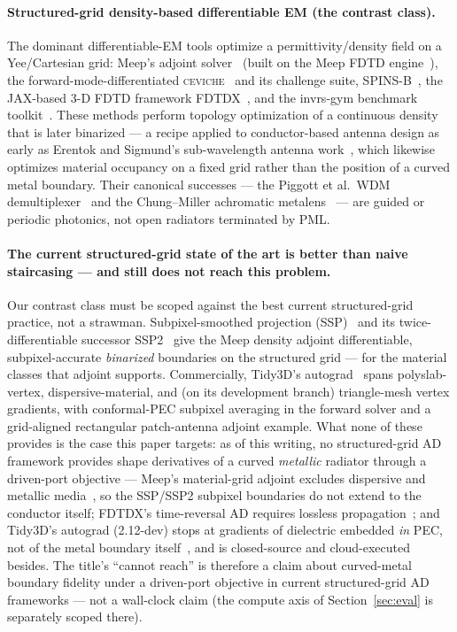 \documentclass{anvil-paper}
\begin{document}
\paragraph{Structured-grid density-based differentiable EM (the contrast class).}
The dominant differentiable-EM tools optimize a permittivity/density field on a
Yee/Cartesian grid: Meep's adjoint solver~\cite{hammond2022meepadjoint} (built
on the Meep FDTD engine~\cite{oskooi2010meep}), the forward-mode-differentiated
\textsc{ceviche}~\cite{hughes2019forward} and its challenge suite,
SPINS-B~\cite{su_spinsb}, the JAX-based 3-D FDTD framework
FDTDX~\cite{fdtdx,mahlau2026fdtdx}, and the invrs-gym benchmark
toolkit~\cite{invrsgym}. These methods perform topology optimization of a
continuous density that is later
binarized --- a recipe applied to conductor-based antenna design as early as
Erentok and Sigmund's sub-wavelength antenna work~\cite{erentok2011topology},
which likewise optimizes material occupancy on a fixed grid rather than the
position of a curved metal boundary. Their canonical successes --- the Piggott
et al.\ WDM demultiplexer~\cite{piggott2015} and the Chung--Miller achromatic
metalens~\cite{chung2020} --- are guided or periodic photonics, not open
radiators terminated by PML.

\paragraph{The current structured-grid state of the art is better than naive
staircasing --- and still does not reach this problem.}
Our contrast class must be scoped against the best current structured-grid
practice, not a strawman. Subpixel-smoothed projection (SSP)~\cite{hammond2025ssp}
and its twice-differentiable successor SSP2~\cite{romano2026ssp2} give the Meep
density adjoint differentiable, subpixel-accurate \emph{binarized} boundaries on
the structured grid --- for the material classes that adjoint supports.
Commercially, Tidy3D's autograd~\cite{tidy3dautograd} spans polyslab-vertex,
dispersive-material, and (on its development branch) triangle-mesh vertex
gradients, with conformal-PEC subpixel averaging in the forward solver and a
grid-aligned rectangular patch-antenna adjoint example. What none of these
provides is the case this paper targets: as of this writing, no structured-grid
AD framework provides shape derivatives of a curved \emph{metallic} radiator
through a driven-port objective --- Meep's material-grid adjoint excludes
dispersive and metallic media~\cite{meepadjointdocs}, so the SSP/SSP2 subpixel
boundaries do not extend to the conductor itself; FDTDX's time-reversal AD
requires lossless propagation~\cite{mahlau2026fdtdx}; and Tidy3D's autograd
(2.12-dev) stops at gradients of dielectric embedded \emph{in} PEC, not of the
metal boundary itself~\cite{tidy3dautograd}, and is closed-source and
cloud-executed besides. The title's ``cannot reach'' is therefore a claim about
curved-metal boundary fidelity under a driven-port objective in current
structured-grid AD frameworks --- not a wall-clock claim (the compute axis of
Section~\ref{sec:eval} is separately scoped there).
\end{document}
